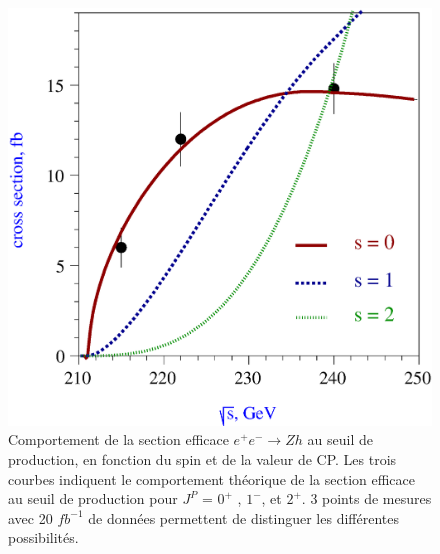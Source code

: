    \begin{figure}[!htb]
     \begin{center} 
       \includegraphics[scale=0.35]{./figures/higgs_spin1.eps}
       \caption{ Comportement de la section efficace $e^+ e^- \rightarrow Zh$ au seuil de production, en fonction du spin et de la valeur de CP. Les trois courbes indiquent le comportement th\'eorique de la section efficace au seuil de production pour $J^P$ = $0^+$ , $1^-$, et $ 2^+$. 3 points de mesures avec 20 $fb^{-1}$ de donn\'ees permettent de distinguer les diff\'erentes possibilit\'es. \cite{Dova:2003py} }
     \label{fig:spinHiggs}
     \end{center}
   \end{figure}
   
